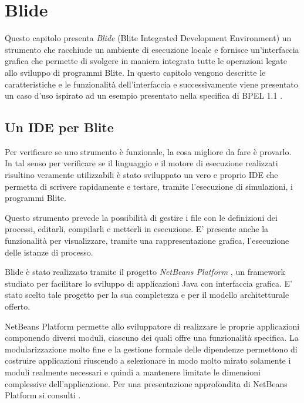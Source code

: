 \chapter{Blide}

Questo capitolo presenta \emph{Blide} (Blite Integrated Development
Environment) un strumento che racchiude un ambiente di esecuzione locale e
fornisce un'interfaccia grafica che permette di svolgere in maniera integrata
tutte le operazioni legate allo sviluppo di programmi Blite. 
In questo capitolo vengono descritte le caratteristiche e le funzionalità
dell'interfaccia e successivamente viene presentato un caso d'uso ispirato ad
un esempio presentato nella specifica di BPEL 1.1 \cite{BPEL10Spec}.

\section{Un IDE per Blite}

Per verificare se uno strumento è funzionale, la cosa migliore da fare
è provarlo. In tal senso per verificare se il linguaggio e il motore di
esecuzione realizzati risultino veramente utilizzabili è stato sviluppato un
vero e proprio IDE che permetta di scrivere rapidamente e testare, tramite
l'esecuzione di simulazioni, i programmi Blite.

Questo strumento prevede la possibilità di
gestire i file con le definizioni dei processi, editarli, compilarli e metterli
in esecuzione. E' presente anche la funzionalità per visualizzare, tramite una
rappresentazione grafica, l'esecuzione delle istanze di processo.

Blide è stato realizzato tramite il progetto \emph{NetBeans Platform}
\cite{NBPlatSite}, un framework studiato per facilitare lo sviluppo di
applicazioni Java con interfaccia grafica. E' stato scelto tale progetto per la sua
completezza e per il modello architetturale offerto. 

NetBeans Platform permette allo sviluppatore di realizzare le proprie
applicazioni componendo diversi moduli, ciascuno dei quali offre una
funzionalità specifica. La modularizzazione molto fine e la gestione
formale delle dipendenze permettono di costruire applicazioni riuscendo a
selezionare in modo molto mirato solamente i moduli realmente necessari e
quindi a mantenere limitate le dimensioni complessive dell'applicazione. 
Per una presentazione approfondita di NetBeans Platform si consulti
\cite{RichClientApp}.

